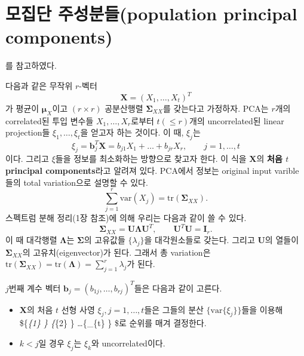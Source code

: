 \documentclass[b5paper,]{scrbook}
\theoremstyle{plain}
\theoremstyle{definition}
\numberwithin{equation}{section}
\begin{document}
\hypertarget{-population-principal-components}{%
\section{모집단 주성분들(population principal components)}\label{-population-principal-components}}

\citep{Izenman2009}를 참고하였다.

다음과 같은 무작위 \(r\)-벡터
\[\mathbf{X}=(X_{1},\ldots, X_{t})^{T}\]
가 평균이 \(\boldsymbol{\mu}_{X}\)이고 \((r\times r)\) 공분산행렬 \(\boldsymbol{\Sigma}_{XX}\)를 갖는다고 가정하자. PCA는 \(r\)개의 correlated된 투입 변수들 \(X_{1},\ldots, X_{r}\)로부터 \(t (\leq r)\)개의 uncorrelated된 linear projection들 \(\xi_{1},\ldots ,\xi_{t}\)을 얻고자 하는 것이다. 이 때, \(\xi_{j}\)는
\begin{equation}
\xi_{j}=\mathbf{b}_{j}^{T}\mathbf{X}=b_{j1}X_{1}+\ldots + b_{jr}X_{r},\qquad{j=1,\ldots , t}
\label{eq:PCAlinearprojection}
\end{equation}
이다. 그리고 \(\xi\)들을 정보를 최소화하는 방향으로 찾고자 한다. 이 식을 \(\mathbf{X}\)의 \textbf{처음 \(t\) principal components}라고 알려져 있다. PCA에서 정보는 original input varible들의 total variation으로 설명할 수 있다.
\[\sum_{j=1}^{r}\text{var}(X_{j})=\text{tr}(\boldsymbol{\Sigma}_{XX}).\]
스펙트럼 분해 정리(1장 참조)에 의해 우리는 다음과 같이 쓸 수 있다.
\[\boldsymbol{\Sigma}_{XX}=\mathbf{U}\boldsymbol{\Lambda}\mathbf{U}^{T}, \qquad{\mathbf{U}^{T}\mathbf{U}=\mathbf{I}_{r}.}\]
이 때 대각행렬 \(\boldsymbol{\Lambda}\)는 \(\boldsymbol{\Sigma}\)의 고유값들 \(\{\lambda_{j}\}\)을 대각원소들로 갖는다. 그리고 \(\mathbf{U}\)의 열들이 \(\boldsymbol{\Sigma}_{XX}\)의 고유치(eigenvector)가 된다. 그래서 총 variation은 \(\text{tr}(\boldsymbol{\Sigma}_{XX})=\text{tr}(\boldsymbol{\Lambda})=\sum_{j=1}^{r}\lambda_{j}\)가 된다.

\(j\)번째 계수 벡터 \(\mathbf{b}_{j}=(b_{1j},\ldots, b_{rj})^{T}\)들은 다음과 같이 고른다.

\begin{itemize}
\item
  \(\mathbf{X}\)의 처음 \(t\) 선형 사영 \(\xi_{j}, j=1,\ldots, t\)들은 그들의 분산 \(\{ \text{var}\{\xi_{j} \} \}\)들을 이용해 \$\{\xi\emph{\{1\} \} \geq {}\{\xi}\{2\} \} \ldots \geq {}\{\xi\_\{t\} \} \$로 순위를 매겨 결정한다.
\item
  \(k<j\)일 경우 \(\xi_{j}\)는 \(\xi_{k}\)와 uncorrelated이다.
\end{itemize}
\end{document}
